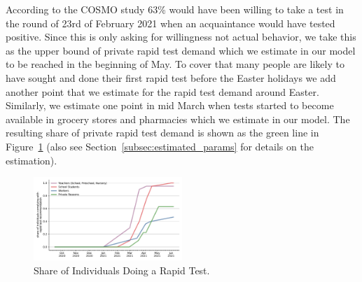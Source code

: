 According to the COSMO study \citep{Betsch2021a} 63\% would have been willing to take a
test in the round of 23rd of February 2021 when an acquaintance would have tested
positive. Since this is only asking for willingness not actual behavior, we take this as
the upper bound of private rapid test demand which we estimate in our model to be reached
in the beginning of May. To cover that many people are likely to have sought and done
their first rapid test before the Easter holidays we add another point that we estimate
for the rapid test demand around Easter. Similarly, we estimate one point in mid March
when tests started to become available in grocery stores and pharmacies which we estimate
in our model. The resulting share of private rapid test demand is shown as the green line
in Figure~\ref{fig:rapid_test_demand} (also see Section~\ref{subsec:estimated_params} for
details on the estimation).


\begin{figure}
    \centering
    \includegraphics[width=0.5\textwidth]{figures/results/figures/data/testing/rapid_test_demand/baseline_shares}
    \caption{Share of Individuals Doing a Rapid Test.}
    \label{fig:rapid_test_demand}
\end{figure}

\FloatBarrier
